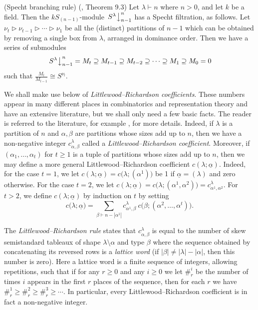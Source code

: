 \documentclass[ALCO,Unicode,published]{cedram}
\newcommand{\ul}[1]{\underline{#1}}
\begin{document}
\begin{theo}\textup{(}Specht branching rule\textup{)}\label{jam_branch_rule_sn:thm}
(\cite{JAMSN}, Theorem 9.3) Let $\lambda \vdash n$ where $n > 0$, and let $k$ be a field. Then the $kS_{(n-1)}$-module
$\left.S^\lambda\right\downarrow^n_{n-1}$ has a Specht filtration, as follows. Let
$\nu_t \triangleright \nu_{t-1} \triangleright \cdots \triangleright \nu_1$ be all the (distinct) partitions of $n-1$ which can be
obtained by removing a single box from $\lambda$, arranged in dominance order. Then we have a series of submodules
\[ \left.S^\lambda\right\downarrow^n_{n-1}  = M_t \supseteq M_{t-1} \supseteq M_{t-2} \supseteq \cdots \supseteq M_1 \supseteq M_0 = 0 \]
such that $\frac{M_l}{M_{l-1}} \cong S^{\nu_l}$.
\end{theo}

We shall make use below of \textit{Littlewood--Richardson coefficients}. These numbers appear in many different places in combinatorics and
representation theory and have an extensive literature, but we shall only need a few basic facts. The reader is referred to the
literature, for example \cite[Chapter 7]{STANEC}, for more details. Indeed, if $\lambda$ is a partition
of $n$ and $\alpha, \beta$ are partitions whose sizes add up to $n$, then we have a non-negative integer $c^\lambda_{\alpha,\beta}$ called
a \textit{Littlewood--Richardson coefficient}. Moreover, if $(\alpha_1,\ldots,\alpha_t)$ for $t \geq 1$ is a tuple of partitions whose
sizes add up to $n$, then we may define a more general Littlewood--Richardson coefficient $c(\lambda;\ul{\alpha})$. Indeed, for the case
$t = 1$, we let $c(\lambda;\ul{\alpha}) = c\bigl(\lambda;(\alpha^1)\bigr)$ be 1 if $\ul{\alpha} = (\lambda)$ and zero otherwise.
For the case $t=2$, we let $c(\lambda;\ul{\alpha}) = c\bigl(\lambda;(\alpha^1,\alpha^2)\bigr) = c^\lambda_{\alpha^1,\alpha^2}$.
For $t > 2$, we define $c(\lambda;\ul{\alpha})$ by induction on $t$ by setting
\begin{equation}\label{lrr_coeff_take_one_off:eq}
c\bigl(\lambda; \ul{\alpha}\bigr) =
\sum_{\beta \vdash n - |\alpha^1|}c^\lambda_{\alpha^1\!,\beta}\:c\bigl(\beta;(\alpha^2,\ldots,\alpha^t)\bigr).
\end{equation}

The \textit{Littlewood--Richardson rule} \cite[Theorem A1.3.3]{STANEC} states that  $c^\lambda_{\alpha,\beta}$ is equal to the number of skew
semistandard tableaux of shape $\lambda \setminus \alpha$ and type $\beta$ where the sequence obtained by concatenating its reversed
rows is a \textit{lattice word} (if $|\beta| \neq |\lambda|-|\alpha|$, then this number is zero). Here a lattice word is a finite
sequence of integers, allowing repetitions, such that if for any $r\geq0$ and any $i\geq0$ we let $\#^i_r$ be the number of times $i$
appears in the first $r$ places of the sequence, then for each $r$ we have $\#^1_r \geqslant \#^2_r \geqslant \#^3_r \geqslant \cdots$.
In particular, every Littlewood--Richardson coefficient is in fact a non-negative integer.
\end{document}

